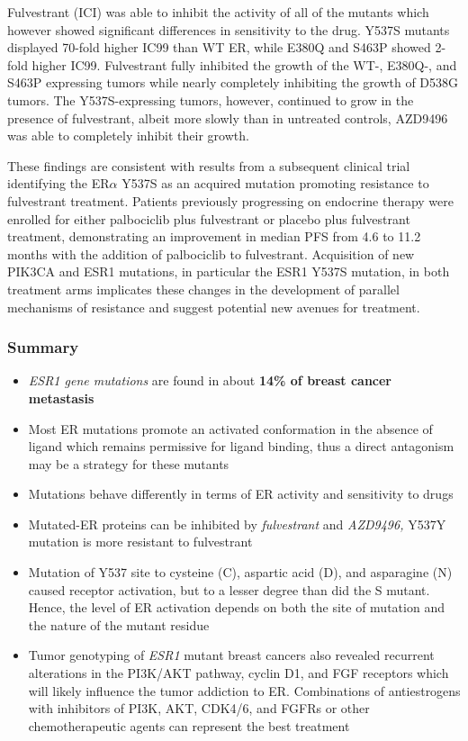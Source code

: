 Fulvestrant (ICI) was able to inhibit the activity of all of the mutants which however showed significant differences in sensitivity to the drug. Y537S mutants displayed 70-fold higher IC99 than WT ER, while E380Q and S463P showed 2-fold higher IC99. Fulvestrant fully inhibited the growth of the WT-, E380Q-, and S463P expressing tumors while nearly completely inhibiting the growth of D538G tumors. The Y537S-expressing tumors, however, continued to grow in the presence of fulvestrant, albeit more slowly than in untreated controls, AZD9496 was able to completely inhibit their growth.

These findings are consistent with results from a subsequent clinical trial identifying the ER$\alpha$ Y537S as an acquired mutation promoting resistance to fulvestrant treatment.
Patients previously progressing on endocrine therapy were enrolled for either palbociclib plus fulvestrant or placebo plus fulvestrant treatment, demonstrating an improvement in median PFS from 4.6 to 11.2 months with the addition of palbociclib to fulvestrant. Acquisition of new PIK3CA and ESR1 mutations, in particular the ESR1 Y537S mutation, in both treatment arms implicates these changes in the development of parallel mechanisms of resistance and suggest potential new avenues for treatment.

\hypertarget{summary}{%
\subsubsection{Summary}\label{summary}}

\begin{itemize}
\tightlist
\item
  \emph{ESR1 gene mutations} are found in about \textbf{14\% of breast cancer metastasis}
\item
  Most ER mutations promote an activated conformation in the absence of ligand which remains
  permissive for ligand binding, thus a direct antagonism may be a strategy for these mutants
\item
  Mutations behave differently in terms of ER activity and sensitivity to drugs
\item
  Mutated-ER proteins can be inhibited by \emph{fulvestrant} and \emph{AZD9496,} Y537Y mutation is more resistant to fulvestrant
\item
  Mutation of Y537 site to cysteine (C), aspartic acid (D), and asparagine (N) caused receptor
  activation, but to a lesser degree than did the S mutant. Hence, the level of ER activation depends on both the site of mutation and the nature of the mutant residue
\item
  Tumor genotyping of \emph{ESR1} mutant breast cancers also revealed recurrent alterations in the
  PI3K/AKT pathway, cyclin D1, and FGF receptors which will likely influence the tumor addiction to ER. Combinations of antiestrogens with inhibitors of PI3K, AKT, CDK4/6, and FGFRs or other chemotherapeutic agents can represent the best treatment
\end{itemize}

